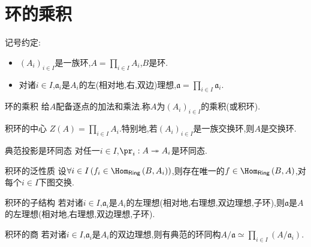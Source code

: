 \section{环的乘积}

记号约定:

\begin{itemize}
	\item $\left(A_{i}\right)_{i\in I}$是一族环,$A=\prod\limits_{i\in I}A_{i}$,$B$是环.
	\item 对诸$i\in I$,$\mathfrak{a}_{i}$是$A_{i}$的左(相对地,右,双边)理想,$\mathfrak{a}=\prod\limits_{i\in I}\mathfrak{a}_{i}$.
\end{itemize}

\begin{definition}{环的乘积}{}
	给$A$配备逐点的加法和乘法.称$A$为$\left(A_{i}\right)_{i\in I}$的乘积(或积环).
\end{definition}

\begin{proposition}{积环的中心}{}
	$Z\left(A\right)=\prod\limits_{i\in I}A_{i}$.特别地,若$\left(A_{i}\right)_{i\in I}$是一族交换环,则$A$是交换环.
\end{proposition}

\begin{proposition}{典范投影是环同态}{}
	对任一$i\in I$,$\pr_{i}:A\twoheadrightarrow A_{i}$是环同态.
\end{proposition}

\begin{proposition}{积环的泛性质}{}
	设$\forall i\in I\left(f_{i}\in\Hom_{\mathsf{Ring}}\left(B,A_{i}\right)\right)$,则存在唯一的$f\in\Hom_{\mathsf{Ring}}\left(B,A\right)$,对每个$i\in I$下图交换.
	\begin{center}
	\end{center}
\end{proposition}

\begin{proposition}{积环的子结构}{}
	若对诸$i\in I$,$\mathfrak{a}_{i}$是$A_{i}$的左理想(相对地,右理想,双边理想,子环),则$\mathfrak{a}$是$A$的左理想(相对地,右理想,双边理想,子环).
\end{proposition}

\begin{proposition}{积环的商}{}
	若对诸$i\in I$,$\mathfrak{a}_{i}$是$A_{i}$的双边理想,则有典范的环同构$A/\mathfrak{a}\simeq\prod\limits_{i\in I}\left(A/\mathfrak{a}_{i}\right)$.
\end{proposition}

